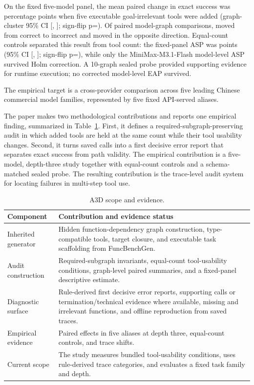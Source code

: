 \documentclass[pdflatex,sn-basic]{sn-jnl}
\begin{document}
On the fixed five-model panel, the mean paired change in exact success was
\StudyMainDeltaPP{} percentage points when five executable goal-irrelevant tools
were added (graph-cluster 95\% CI
[\StudyMainCILowPP, \StudyMainCIHighPP]; sign-flip p=\StudyMainSignFlipP). Of
\StudyMainPairs{} paired model-graph comparisons, \StudyBaselineOnly{} moved from
correct to incorrect and \StudyDistractorOnly{} moved in the opposite direction.
Equal-count controls separated this result from tool count: the fixed-panel ASP
was \StudyASPP{} points (95\% CI
[\StudyASPCILowPP, \StudyASPCIHighPP]; sign-flip p=\StudyASPSignFlipP), while
only the MiniMax-M3.1-Flash model-level ASP survived Holm correction. A 10-graph sealed
probe provided supporting evidence for runtime execution; no corrected
model-level EAP survived.

The empirical target is a cross-provider comparison across five leading Chinese
commercial model families, represented by five fixed API-served aliases.

The paper makes two methodological contributions and reports one empirical
finding,
summarized in Table~\ref{tab:contribution-boundary}.
First, it defines a required-subgraph-preserving audit in which added tools are
held at the same count while their tool usability changes. Second, it
turns saved calls into a first decisive error report that separates exact success from
path validity. The empirical contribution is a five-model, depth-three study
together with equal-count controls and a schema-matched sealed probe. The
resulting contribution is the trace-level audit system for locating failures
in multi-step tool use.

\begin{table}[htbp]
\centering
\caption{A3D scope and evidence.}
\label{tab:contribution-boundary}
\footnotesize
\begin{tabularx}{\textwidth}{>{\raggedright\arraybackslash}p{}X}
\toprule
Component & Contribution and evidence status \\
\midrule
Inherited generator & Hidden function-dependency graph construction,
type-compatible tools, target closure, and executable task scaffolding from
FuncBenchGen. \\
Audit construction & Required-subgraph invariants, equal-count
tool-usability conditions, graph-level paired summaries, and a
fixed-panel descriptive estimate. \\
Diagnostic surface & Rule-derived first decisive error reports, supporting calls
or termination/technical evidence where available, missing and irrelevant
functions, and offline reproduction from saved traces. \\
Empirical evidence & Paired effects in five aliases at depth three, equal-count
controls, and trace shifts. \\
Current scope & The study measures bundled tool-usability conditions, uses
rule-derived trace categories, and evaluates a fixed task family and depth. \\
\bottomrule
\end{tabularx}
\end{table}
\end{document}
